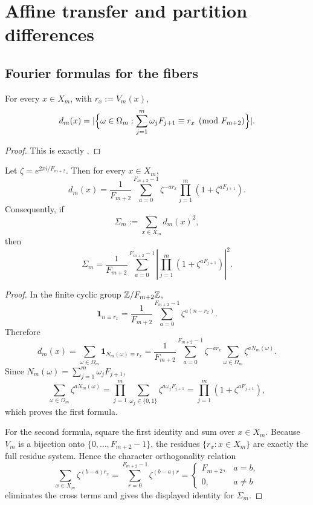 \section{Affine transfer and partition differences}\label{sec:residue-affine}

\subsection{Fourier formulas for the fibers}

\begin{theorem}
\label{thm:residue-fibers}
For every \(x\in X_m\), with \(r_x:=V_m(x)\),
\[
  d_m(x)
  =
  \lvert \Bigl\{\omega\in\Omega_m:
  \sum_{j=1}^m\omega_jF_{j+1}\equiv r_x \pmod{F_{m+2}}\Bigr\} \rvert.
\]
\end{theorem}

\begin{proof}
This is exactly .
\end{proof}

\begin{theorem}
\label{thm:fourier-inversion}
Let \(\zeta=e^{2\pi i/F_{m+2}}\).  Then for every \(x\in X_m\),
\[
  d_m(x)=\frac{1}{F_{m+2}}
  \sum_{a=0}^{F_{m+2}-1}
  \zeta^{-ar_x}\prod_{j=1}^m(1+\zeta^{aF_{j+1}}).
\]
Consequently, if
\[
  \Sigma_m:=\sum_{x\in X_m}d_m(x)^2,
\]
then
\[
  \Sigma_m=
  \frac{1}{F_{m+2}}
  \sum_{a=0}^{F_{m+2}-1}
  \left|
    \prod_{j=1}^m(1+\zeta^{aF_{j+1}})
  \right|^2.
\]
\end{theorem}

\begin{proof}
In the finite cyclic group \(\mathbb{Z}/F_{m+2}\mathbb{Z}\),
\[
  \mathbf{1}_{n\equiv r_x}
  =
  \frac{1}{F_{m+2}}
  \sum_{a=0}^{F_{m+2}-1}\zeta^{a(n-r_x)}.
\]
Therefore
\[
  d_m(x)
  =
  \sum_{\omega\in\Omega_m}\mathbf{1}_{N_m(\omega)\equiv r_x}
  =
  \frac{1}{F_{m+2}}
  \sum_{a=0}^{F_{m+2}-1}
  \zeta^{-ar_x}
  \sum_{\omega\in\Omega_m}\zeta^{aN_m(\omega)}.
\]
Since \(N_m(\omega)=\sum_{j=1}^m \omega_jF_{j+1}\),
\[
  \sum_{\omega\in\Omega_m}\zeta^{aN_m(\omega)}
  =
  \prod_{j=1}^m\sum_{\omega_j\in\{0,1\}}\zeta^{a\omega_jF_{j+1}}
  =
  \prod_{j=1}^m(1+\zeta^{aF_{j+1}}),
\]
which proves the first formula.

For the second formula, square the first identity and sum over \(x\in X_m\).
Because \(V_m\) is a bijection onto \(\{0,\dots,F_{m+2}-1\}\), the residues
\(\{r_x:x\in X_m\}\) are exactly the full residue system.  Hence the character
orthogonality relation
\[
  \sum_{x\in X_m}\zeta^{(b-a)r_x}
  =
  \sum_{r=0}^{F_{m+2}-1}\zeta^{(b-a)r}
  =
  \begin{cases}
    F_{m+2}, & a=b,\\
    0, & a\neq b
  \end{cases}
\]
eliminates the cross terms and gives the displayed identity for \(\Sigma_m\).
\end{proof}

